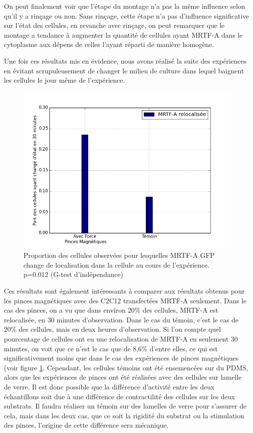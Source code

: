 On peut finalement voir que l'étape du montage n'a pas la même influence selon qu'il y a rinçage ou non. Sans rinçage, cette étape n'a pas d'influence significative sur l'état des cellules, en revanche avec rinçage, on peut remarquer que le montage a tendance à augmenter la quantité de cellules ayant MRTF-A dans le cytoplasme aux dépens de celles l'ayant réparti de manière homogène. 

Une fois ces résultats mis en évidence, nous avons réalisé la suite des expériences en évitant scrupuleusement de changer le milieu de culture dans lequel baignent les cellules le jour même de l'expérience. 

\begin{figure}
\includegraphics[scale=0.4]{Figures/Pinces_vs_temoin.png} 
\caption{\label{pinces_vs_temoin} Proportion des cellules observées pour lesquelles MRTF-A GFP change de localisation dans la cellule au cours de l'expérience. p=0.012 (G-test d'indépendance)}
\end{figure}

Ces résultats sont également intéressants à comparer aux résultats obtenus pour les pinces magnétiques avec des C2C12 transfectées MRTF-A seulement. Dans le cas des pinces, on a vu que dans environ 20\% des cellules, MRTF-A est relocalisée, en 30 minutes d'observation. Dans le cas du témoin, c'est le cas de 20\% des cellules, mais en deux heures d'observation. Si l'on compte quel pourcentage de cellules ont eu une relocalisation de MRTF-A en seulement 30 minutes, on voit que ce n'est le cas que de 8,6\% d'entre elles, ce qui est significativement moins que dans le cas des expériences de pinces magnétiques (voir figure \ref{pinces_vs_temoin}.
Cependant, les cellules témoins ont été ensemencées sur du PDMS, alors que les expériences de pinces ont été réalisées avec des cellules sur lamelle de verre. Il est donc possible que la différence d'activité entre les deux échantillons soit due à une différence de contractilité des cellules sur les deux substrats. Il faudra réaliser un témoin sur des lamelles de verre pour s'assurer de cela, mais dans les deux cas, que ce soit la rigidité du substrat ou la stimulation des pinces, l'origine de cette différence sera mécanique. 

